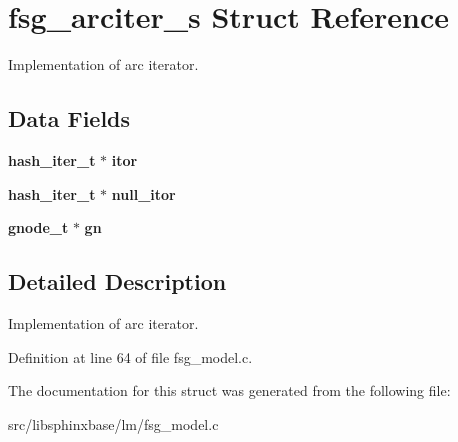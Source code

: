 \section{fsg\-\_\-arciter\-\_\-s Struct Reference}
\label{structfsg__arciter__s}


Implementation of arc iterator.  


\subsection*{Data Fields}
\begin{DoxyCompactItemize}
\item 
{\bf hash\-\_\-iter\-\_\-t} $\ast$ {\bfseries itor}\label{structfsg__arciter__s_a74aaa5ebff00f4dfe5dfdfe2dc3a1fb4}

\item 
{\bf hash\-\_\-iter\-\_\-t} $\ast$ {\bfseries null\-\_\-itor}\label{structfsg__arciter__s_a9b71932d419732c17820aec91fbc4c0d}

\item 
{\bf gnode\-\_\-t} $\ast$ {\bfseries gn}\label{structfsg__arciter__s_ad11c7f44550802377bb684620c43826a}

\end{DoxyCompactItemize}


\subsection{Detailed Description}
Implementation of arc iterator. 

Definition at line 64 of file fsg\-\_\-model.\-c.



The documentation for this struct was generated from the following file\-:\begin{DoxyCompactItemize}
\item 
src/libsphinxbase/lm/fsg\-\_\-model.\-c\end{DoxyCompactItemize}
